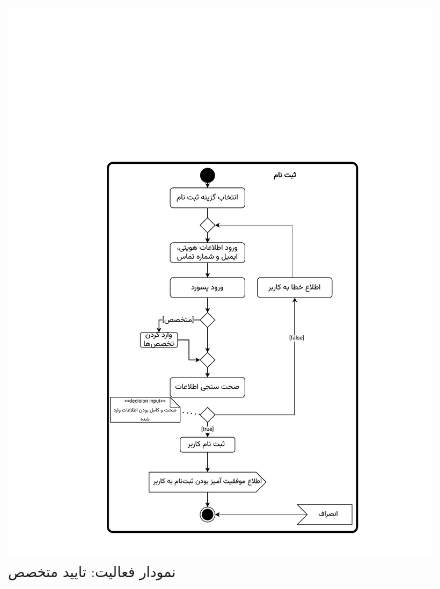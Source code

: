 \begin{figure}
	\centering
	\includegraphics[scale=0.8, page=6]{figs/OOD-activity1-10.pdf}
	\caption{نمودار فعالیت: تایید متخصص}
\end{figure}
\FloatBarrier
\newpage

